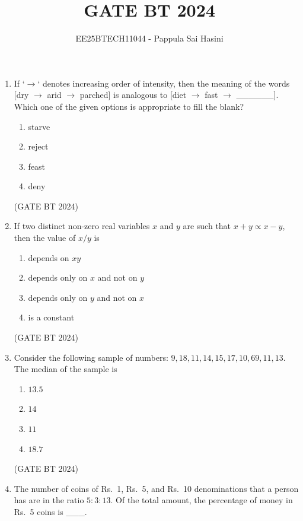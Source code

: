 \documentclass[journal,12pt,onecolumn]{IEEEtran}
\theoremstyle{remark}
\begin{document}
\title{GATE BT 2024}
\author{EE25BTECH11044 - Pappula Sai Hasini}
\maketitle
\renewcommand{\thefigure}{\theenumi}
\renewcommand{\thetable}{\theenumi}
\begin{enumerate}
\item
If `$\rightarrow$` denotes increasing order of intensity, then the meaning of the words [dry $\rightarrow$ arid $\rightarrow$ parched] is analogous to [diet $\rightarrow$ fast $\rightarrow$ \_\_\_\_\_\_]. Which one of the given options is appropriate to fill the blank?
\begin{enumerate}
   \item starve 
   \item reject 
   \item feast 
   \item deny 
\end{enumerate}
\hfill(GATE BT 2024)


\item 
If two distinct non-zero real variables $x$ and $y$ are such that $x+y \propto x-y$, then the value of $x/y$ is

\begin{enumerate}
    \item depends on $xy$
    \item depends only on $x$ and not on $y$
    \item depends only on $y$ and not on $x$
    \item is a constant
\end{enumerate}
\hfill(GATE BT 2024)

\item 
Consider the following sample of numbers: $9, 18, 11, 14, 15, 17, 10, 69, 11, 13$. The median of the sample is

\begin{enumerate}
    \item $13.5$
    \item $14$
    \item $11$
    \item $18.7$
\end{enumerate}
\hfill(GATE BT 2024)

\item The number of coins of Rs.~1, Rs.~5, and Rs.~10 denominations that a person has are in the ratio $5:3:13$. Of the total amount, the percentage of money in Rs.~5 coins is \_\_\_.


\end{enumerate}
\end{document}
